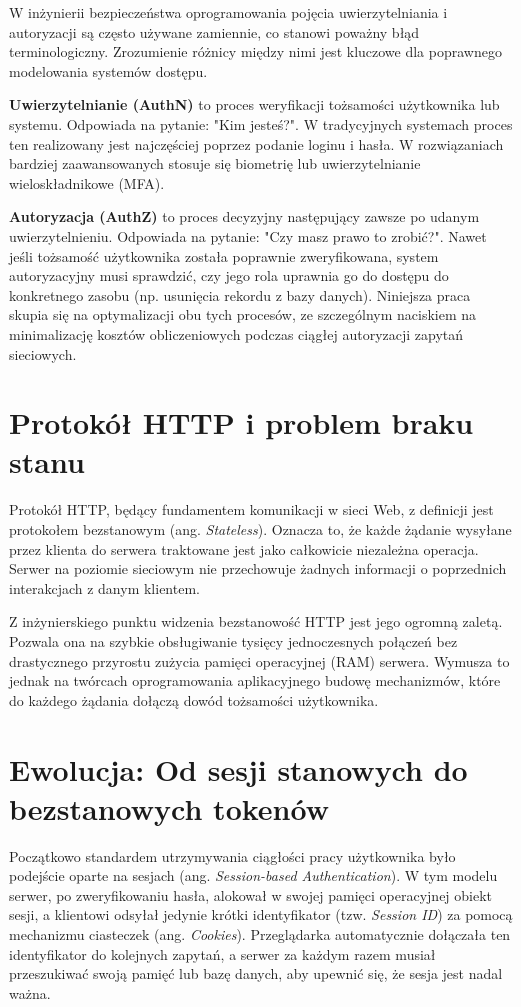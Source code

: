 \documentclass{SGGW-thesis}
\begin{document}
W inżynierii bezpieczeństwa oprogramowania pojęcia uwierzytelniania i autoryzacji są często używane zamiennie, co stanowi poważny błąd terminologiczny. Zrozumienie różnicy między nimi jest kluczowe dla poprawnego modelowania systemów dostępu.

\textbf{Uwierzytelnianie (AuthN)} to proces weryfikacji tożsamości użytkownika lub systemu. Odpowiada na pytanie: "Kim jesteś?". W tradycyjnych systemach proces ten realizowany jest najczęściej poprzez podanie loginu i hasła. W rozwiązaniach bardziej zaawansowanych stosuje się biometrię lub uwierzytelnianie wieloskładnikowe (MFA).

\textbf{Autoryzacja (AuthZ)} to proces decyzyjny następujący zawsze po udanym uwierzytelnieniu. Odpowiada na pytanie: "Czy masz prawo to zrobić?". Nawet jeśli tożsamość użytkownika została poprawnie zweryfikowana, system autoryzacyjny musi sprawdzić, czy jego rola uprawnia go do dostępu do konkretnego zasobu (np. usunięcia rekordu z bazy danych). Niniejsza praca skupia się na optymalizacji obu tych procesów, ze szczególnym naciskiem na minimalizację kosztów obliczeniowych podczas ciągłej autoryzacji zapytań sieciowych.

\section{Protokół HTTP i problem braku stanu}

Protokół HTTP, będący fundamentem komunikacji w sieci Web, z definicji jest protokołem bezstanowym (ang. \textit{Stateless}). Oznacza to, że każde żądanie wysyłane przez klienta do serwera traktowane jest jako całkowicie niezależna operacja. Serwer na poziomie sieciowym nie przechowuje żadnych informacji o poprzednich interakcjach z danym klientem.

Z inżynierskiego punktu widzenia bezstanowość HTTP jest jego ogromną zaletą. Pozwala ona na szybkie obsługiwanie tysięcy jednoczesnych połączeń bez drastycznego przyrostu zużycia pamięci operacyjnej (RAM) serwera. Wymusza to jednak na twórcach oprogramowania aplikacyjnego budowę mechanizmów, które do każdego żądania dołączą dowód tożsamości użytkownika.

\clearpage

\section{Ewolucja: Od sesji stanowych do bezstanowych tokenów}

Początkowo standardem utrzymywania ciągłości pracy użytkownika było podejście oparte na sesjach (ang. \textit{Session-based Authentication}). W tym modelu serwer, po zweryfikowaniu hasła, alokował w swojej pamięci operacyjnej obiekt sesji, a klientowi odsyłał jedynie krótki identyfikator (tzw. \textit{Session ID}) za pomocą mechanizmu ciasteczek (ang. \textit{Cookies}). Przeglądarka automatycznie dołączała ten identyfikator do kolejnych zapytań, a serwer za każdym razem musiał przeszukiwać swoją pamięć lub bazę danych, aby upewnić się, że sesja jest nadal ważna.
\end{document}

